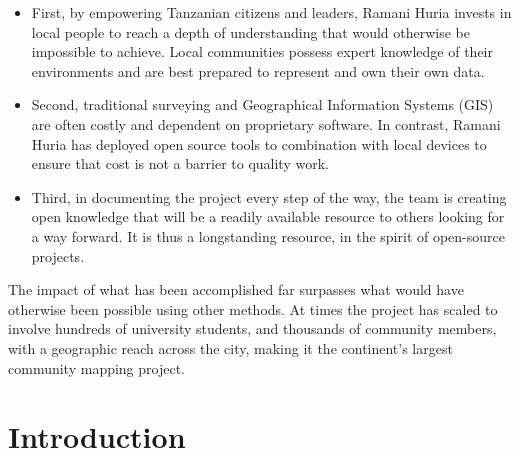 \documentclass[a4paper,12pt,twoside]{article}
\begin{document}
\begin{mdframed}[hidealllines=true,backgroundcolor=RHgreen!10,innerleftmargin=6pt,innerrightmargin=6pt,leftmargin=-3pt,rightmargin=-3pt]
\begin{itemize}
    \item First, by empowering Tanzanian citizens and leaders, Ramani Huria invests in local people to reach a depth of understanding that would otherwise be impossible to achieve. Local communities possess expert knowledge of their environments and are best prepared to represent and own their own data. 
    \item Second, traditional surveying and Geographical Information Systems (GIS) are often costly and dependent on proprietary software. In contrast, Ramani Huria has deployed open source tools to combination with local devices to ensure that cost is not a barrier to quality work.  
    \item Third, in documenting the project every step of the way, the team is creating open knowledge that will be a readily available resource to others looking for a way forward. It is thus a longstanding resource, in the spirit of open-source projects. 
\end{itemize}
\end{mdframed}

\begin{multicols}{2}

The impact of what has been accomplished far surpasses what would have otherwise been possible using other methods. At times the project has scaled to involve hundreds of university students, and thousands of community members, with a geographic reach across the city, making it the continent's largest community mapping project.
\end{multicols}

\newpage
\section{Introduction}
\end{document}
